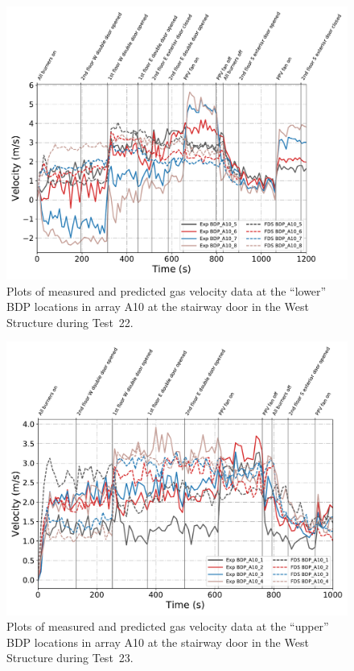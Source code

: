 \begin{figure}[!h]
	\centering
	\includegraphics[width=\columnwidth]{Figures/Plots/Validation/Velocity/Test_22_BDP_A10_lower}
	\caption[Plots of measured and predicted gas velocity data at ``lower'' BDP locations in A10 during Test~22.]{Plots of measured and predicted gas velocity data at the ``lower'' BDP locations in array A10 at the stairway door in the West Structure during Test~22.}
	\label{fig:Test22_lower_BDPs}
\end{figure}

\begin{figure}[!h]
	\centering
	\includegraphics[width=\columnwidth]{Figures/Plots/Validation/Velocity/Test_23_BDP_A10_upper}
	\caption[Plots of measured and predicted gas velocity data at ``upper'' BDP locations in A10 during Test~23.]{Plots of measured and predicted gas velocity data at the ``upper'' BDP locations in array A10 at the stairway door in the West Structure during Test~23.}
	\label{fig:Test23_upper_BDPs}
\end{figure}

